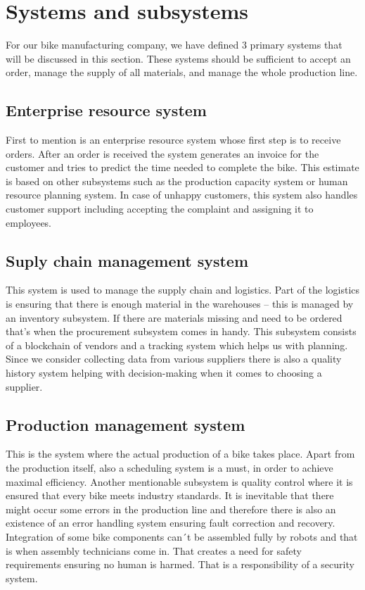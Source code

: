 \section{Systems and subsystems}
For our bike manufacturing company, we have defined 3 primary systems that will be discussed in this section. These systems should be sufficient to accept an order, manage the supply of all materials, and manage the whole production line.

\subsection{Enterprise resource system}
First to mention is an enterprise resource system whose first step is to receive orders. After an order is received the system generates an invoice for the customer and tries to predict the time needed to complete the bike. This estimate is based on other subsystems such as the production capacity system or human resource planning system. In case of unhappy customers, this system also handles customer support including accepting the complaint and assigning it to employees.

\subsection{Suply chain management system}
This system is used to manage the supply chain and logistics. Part of the logistics is ensuring that there is enough material in the warehouses -- this is managed by an inventory subsystem. If there are materials missing and need to be ordered that's when the procurement subsystem comes in handy. This subsystem consists of a blockchain of vendors and a tracking system which helps us with planning. Since we consider collecting data from various suppliers there is also a quality history system helping with decision-making when it comes to choosing a supplier.

\subsection{Production management system}
This is the system where the actual production of a bike takes place. Apart from the production itself, also a scheduling system is a must, in order to achieve maximal efficiency. Another mentionable subsystem is quality control where it is ensured that every bike meets industry standards. It is inevitable that there might occur some errors in the production line and therefore there is also an existence of an error handling system ensuring fault correction and recovery. Integration of some bike components can´t be assembled fully by robots and that is when assembly technicians come in. That creates a need for safety requirements ensuring no human is harmed. That is a responsibility of a security system.